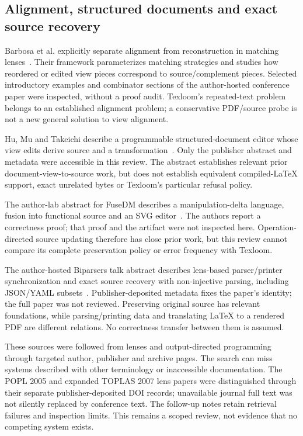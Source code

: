 \subsection{Alignment, structured documents and exact source recovery}
Barbosa et al. explicitly separate alignment from reconstruction in matching
lenses~\cite{barbosa2010matching}. Their framework parameterizes matching
strategies and studies how reordered or edited view pieces correspond to
source/complement pieces. Selected introductory examples and combinator
sections of the author-hosted conference paper were inspected, without a
proof audit. Texloom's repeated-text problem belongs to an established
alignment problem; a conservative PDF/source probe is not a new general
solution to view alignment.

Hu, Mu and Takeichi describe a programmable structured-document editor whose
view edits derive source and a transformation~\cite{hu2008programmable}.
Only the publisher abstract and metadata were accessible in this review.
The abstract establishes relevant prior document-view-to-source work, but
does not establish equivalent compiled-LaTeX support, exact unrelated bytes
or Texloom's particular refusal policy.

The author-lab abstract for FuseDM describes a manipulation-delta language,
fusion into functional source and an SVG editor~\cite{zhang2024fusing}. The
authors report a correctness proof; that proof and the artifact were not
inspected here. Operation-directed source updating therefore has close prior
work, but this review cannot compare its complete preservation policy or error
frequency with Texloom.

The author-hosted Biparsers talk abstract describes lens-based parser/printer
synchronization and exact source recovery with non-injective parsing, including
JSON/YAML subsets~\cite{xie2025biparsers}. Publisher-deposited metadata fixes
the paper's identity; the full paper was not reviewed. Preserving original
source has relevant foundations, while parsing/printing data and translating
LaTeX to a rendered PDF are different relations. No correctness transfer
between them is assumed.

These sources were followed from lenses and output-directed programming
through targeted author, publisher and archive pages. The search can miss
systems described with other terminology or inaccessible documentation. The
POPL 2005 and expanded TOPLAS 2007 lens papers were distinguished through
their separate publisher-deposited DOI records; unavailable journal full text
was not silently replaced by conference text. The follow-up notes retain
retrieval failures and inspection limits. This remains a scoped review,
not evidence that no competing system exists.


